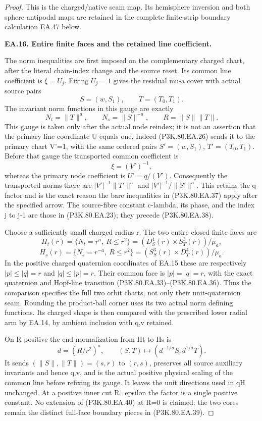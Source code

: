 \begin{proof}
This is the charged/native seam map. Its hemisphere inversion and both sphere antipodal maps are retained in the complete finite-strip boundary calculation EA.47 below.

\par\medskip\noindent\textbf{EA.16. Entire finite faces and the retained line coefficient.}\par\nopagebreak[4]

The norm inequalities are first imposed on the complementary
charged chart, after the literal chain-index change and the source
reset. Its common line coefficient is \(\xi=U_j\). Fixing
\(U_j=1\) gives the residual mu-a cover with actual source pairs
\[
                 S=(w,S_1),\qquad T=(T_0,T_1).
\]
The invariant norm functions in this gauge are exactly
\[
                  N_t=\|T\|^a,\qquad
                  N_s=\|S\|^{-a},\qquad R=\|S\|\|T\|.
 \tag{P3K.80.EA.37}
\]
This gauge is taken only after the actual node reindex; it is not
an assertion that the primary line coordinate U equals one.
Indeed (P3K.80.EA.26) sends it to the primary chart V'=1, with the same
ordered pairs \(S'=(w,S_1)\), \(T'=(T_0,T_1)\). Before that
gauge the transported common coefficient is
\[
                         \xi=(V')^{-1},
 \tag{P3K.80.EA.38}
\]
whereas the primary node coefficient is \(U'=q/(V')\).
Consequently the transported norms there are
\(|V'|^{-1}\|T'\|^a\) and
\(|V'|^{-1}/\|S'\|^a\). This retains the q-factor and is the
exact reason the bare inequalities in (P3K.80.EA.37) apply after the
specified arrow. The source-fibre constant c-lambda, its phase,
and the index j to j-1 are those in (P3K.80.EA.23); they precede (P3K.80.EA.38).

Choose a sufficiently small charged radius r. The two entire
closed finite faces are
\[
 H_t(r)=\{N_t=r^a,\ R\le r^2\}
       =(D^4_S(r)\times S^3_T(r))/\mu_a,
\]
\[
 H_s(r)=\{N_s=r^{-a},\ R\le r^2\}
       =(S^3_S(r)\times D^4_T(r))/\mu_a.
 \tag{P3K.80.EA.39}
\]
In the positive charged quaternion coordinates of EA.15 these
are respectively \(|p|\le|q|=r\) and
\(|q|\le|p|=r\). Their common face is
\(|p|=|q|=r\), with the exact quaternion and Hopf-line
transition (P3K.80.EA.33)--(P3K.80.EA.36). Thus the comparison specifies the
full two orbit charts, not only their unit-quaternion seam.
Rounding the product-ball corner uses its two actual norm defining
functions. Its charged shape is then compared with the prescribed
lower radial arm by EA.14, by ambient inclusion with q,v retained.

On R positive the end normalization from Ht to Hs is
\[
             d=(R/r^2)^a,\qquad
             (S,T)\longmapsto(d^{-1/a}S,d^{1/a}T).
 \tag{P3K.80.EA.40}
\]
It sends \((\|S\|,\|T\|)=(s,r)\) to \((r,s)\),
preserves all source auxiliary invariants and hence q,v, and is
the actual positive physical scaling of the common line before
refixing its gauge. It leaves the unit directions used in qH
unchanged. At a positive inner cut R=epsilon the factor is a
single positive constant. No extension of (P3K.80.EA.40) at R=0 is
claimed: the two cores remain the distinct full-face boundary
pieces in (P3K.80.EA.39).


\end{proof}
